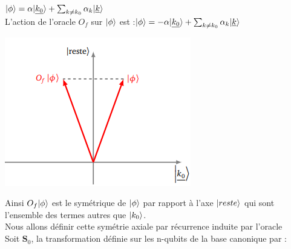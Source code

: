 \documentclass[12pt,openany]{report}
\DeclarePairedDelimiter\ket{\lvert}{\rangle}
\begin{document}
$ \ket{\phi}=\alpha \ket{\underline{k_0}}+ \sum_{ k \neq k_0}\alpha_k  \ket{\underline{k}}$\\
L'action de l'oracle $O_f $ sur $ \ket{\phi}$ est :$ \ket{\phi}=-\alpha \ket{\underline{k_0}}+ \sum_{ k \neq k_0}\alpha_k  \ket{\underline{k}}$
 
\begin{center}
\includegraphics[scale=1]{./symetrie}
\end{center}

Ainsi $O_f \ket{\phi} $ est le symétrique de $\ket{\phi} $ par rapport à l'axe $\ket{reste} $ qui sont l'ensemble des termes autres que $\ket{k_0} $.\\
Nous allons définir cette symétrie axiale par récurrence induite par l'oracle\\

Soit $\mathbf{S}_0 $, la transformation définie sur les n-qubits de la base canonique par :
\end{document}
